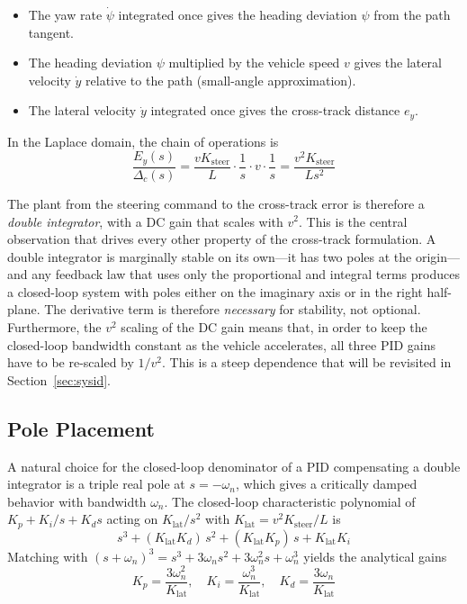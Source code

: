 \begin{itemize}
    \item The yaw rate $\dot{\psi}$ integrated once gives the heading deviation $\psi$ from the path tangent.
    \item The heading deviation $\psi$ multiplied by the vehicle speed $v$ gives the lateral velocity $\dot{y}$ relative to the path (small-angle approximation).
    \item The lateral velocity $\dot{y}$ integrated once gives the cross-track distance $e_y$.
\end{itemize}

In the Laplace domain, the chain of operations is
\begin{equation}
    \frac{E_y(s)}{\Delta_c(s)} = \frac{v K_{\mathrm{steer}}}{L} \cdot \frac{1}{s} \cdot v \cdot \frac{1}{s} = \frac{v^2 K_{\mathrm{steer}}}{L s^2}
    \label{eq:xtrack_plant}
\end{equation}

The plant from the steering command to the cross-track error is therefore a \emph{double integrator}, with a DC gain that scales with $v^2$. This is the central observation that drives every other property of the cross-track formulation. A double integrator is marginally stable on its own---it has two poles at the origin---and any feedback law that uses only the proportional and integral terms produces a closed-loop system with poles either on the imaginary axis or in the right half-plane. The derivative term is therefore \emph{necessary} for stability, not optional. Furthermore, the $v^2$ scaling of the DC gain means that, in order to keep the closed-loop bandwidth constant as the vehicle accelerates, all three PID gains have to be re-scaled by $1/v^2$. This is a steep dependence that will be revisited in Section~\ref{sec:sysid}.

\subsection{Pole Placement}
A natural choice for the closed-loop denominator of a PID compensating a double integrator is a triple real pole at $s = -\omega_n$, which gives a critically damped behavior with bandwidth $\omega_n$. The closed-loop characteristic polynomial of $K_p + K_i / s + K_d s$ acting on $K_{\mathrm{lat}} / s^2$ with $K_{\mathrm{lat}} = v^2 K_{\mathrm{steer}} / L$ is
\begin{equation}
    s^3 + (K_{\mathrm{lat}} K_d)\, s^2 + (K_{\mathrm{lat}} K_p)\, s + K_{\mathrm{lat}} K_i
\end{equation}
Matching with $(s + \omega_n)^3 = s^3 + 3\omega_n s^2 + 3\omega_n^2 s + \omega_n^3$ yields the analytical gains
\begin{equation}
    K_p = \frac{3\omega_n^2}{K_{\mathrm{lat}}}, \quad K_i = \frac{\omega_n^3}{K_{\mathrm{lat}}}, \quad K_d = \frac{3\omega_n}{K_{\mathrm{lat}}}
    \label{eq:xtrack_gains}
\end{equation}

